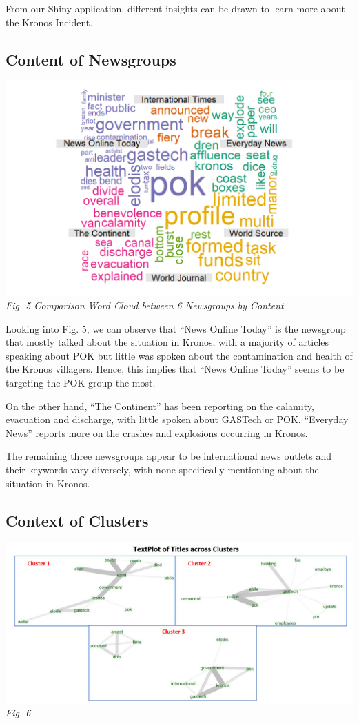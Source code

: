 \documentclass{acm_proc_article-sp}
\begin{document}
From our Shiny application, different insights can be drawn to learn
more about the Kronos Incident.

\hypertarget{content-of-newsgroups}{%
\subsection{Content of Newsgroups}\label{content-of-newsgroups}}

\includegraphics{img/image03.png} \emph{Fig. 5 Comparison Word Cloud
between 6 Newsgroups by Content}

Looking into Fig. 5, we can observe that ``News Online Today'' is the
newsgroup that mostly talked about the situation in Kronos, with a
majority of articles speaking about POK but little was spoken about the
contamination and health of the Kronos villagers. Hence, this implies
that ``News Online Today'' seems to be targeting the POK group the most.

On the other hand, ``The Continent'' has been reporting on the calamity,
evacuation and discharge, with little spoken about GASTech or POK.
``Everyday News'' reports more on the crashes and explosions occurring
in Kronos.

The remaining three newsgroups appear to be international news outlets
and their keywords vary diversely, with none specifically mentioning
about the situation in Kronos.

\hypertarget{context-of-clusters}{%
\subsection{Context of Clusters}\label{context-of-clusters}}

\includegraphics{img/image12.png} \emph{Fig. 6}
\end{document}
